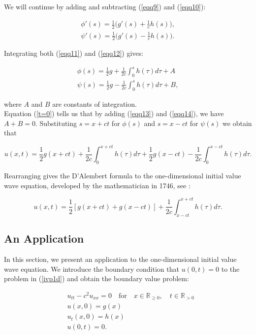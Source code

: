 \documentclass[a4paper, 12pt]{article}
\numberwithin{equation}{section}
\begin{document}
We will continue by adding and subtracting (\ref{eqq9}) and (\ref{eqq10}):

\begin{align} \label{eqq11}
    \phi'(s)=\frac{1}{2}\Big(g'(s)+\frac{1}{c}h(s)\Big),\\
    \label{eqq12}
    \psi'(s)=\frac{1}{2}\Big(g'(s)-\frac{1}{c}h(s)\Big).
\end{align}

Integrating both (\ref{eqq11}) and (\ref{eqq12}) gives:

\begin{align} \label{eqq13}
    \phi(s)=\frac{1}{2}g+\frac{1}{2c}\int^s_0h(\tau)d\tau+A\\
    \label{eqq14}
    \psi(s)=\frac{1}{2}g-\frac{1}{2c}\int^s_0h(\tau)d\tau+B,
\end{align}

where $A$ and $B$ are constants of integration. \\

Equation (\ref{t=0}) tells us that by adding (\ref{eqq13}) and (\ref{eqq14}), we
have $A+B=0$. Substituting $s=x+ct$ for $\phi(s)$ and $s=x-ct$ for $\psi(s)$ we
obtain that

\begin{equation*}
    u(x,t)=\frac{1}{2}g(x+ct)+\frac{1}{2c}\int^{x+ct}_0h(\tau)d\tau+\frac{1}{2}g(x-ct)-\frac{1}{2c}\int^{x-ct}_0h(\tau)d\tau.
\end{equation*}

Rearranging gives the D'Alembert formula to the one-dimensional initial value
wave equation, developed by the mathematician in 1746, see \cite[Ch. 2.1]{Str}:

\begin{equation} \label{DAla}
    u(x,t)=\frac{1}{2}\left[g(x+ct)+g(x-ct)\right]+\frac{1}{2c}\int^{x+ct}_{x-ct}h(\tau)d\tau.
\end{equation}

\subsection{An Application} \label{anapplication}
In this section, we present an application to the one-dimensional
initial value wave equation. We introduce the boundary condition that $u(0,t)=0$
to the problem in (\ref{ivp1d}) and obtain the boundary value problem:

\begin{equation} \label{bvp1d}
    \begin{aligned}
    &u_{tt}-c^2u_{xx}=0 \quad \textrm {for} \quad x \in \mathbb{R}_{\ge 0}, \quad t \in \mathbb{R}_{>0}\\
    &u(x,0)=g(x)\\
    &u_t(x,0)=h(x)\\
    &u(0,t)=0.
    \end{aligned}
\end{equation}
\end{document}
